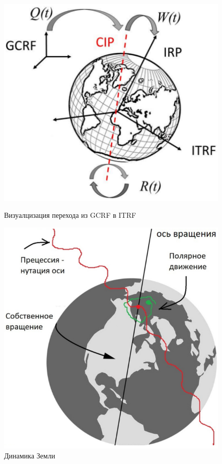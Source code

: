 \begin{figure}[h!]
    \begin{minipage}[c]{0.45\textwidth}
        \centering
        \includegraphics[width=\linewidth]{../images/review/qrw.png}
        \caption{Визуалцизация перехода из GCRF в ITRF}
        \label{fig:qrw}
    \end{minipage}
    \hfill
    \begin{minipage}[c]{0.45\textwidth}
        \centering
        \includegraphics[width=\linewidth]{../images/review/gcrs_itrs.png}
        \caption{Динамика Земли}
        \label{fig:gcrs_itrs}
    \end{minipage}
\end{figure}

